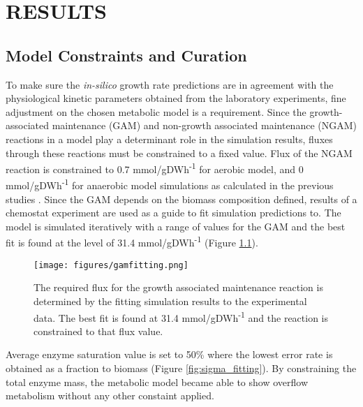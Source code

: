 \chapter{RESULTS}

\section{Model Constraints and Curation}


To make sure the \emph{in-silico} growth rate predictions are in agreement with the physiological kinetic parameters obtained from the laboratory experiments, fine adjustment on the chosen metabolic model is a requirement. Since the growth-associated maintenance (GAM) and non-growth associated maintenance (NGAM) reactions in a model play a determinant role in the simulation results, fluxes through these reactions must be constrained to a fixed value. Flux of the NGAM reaction is constrained to 0.7 mmol/gDWh\textsuperscript{-1} for aerobic model, and 0 mmol/gDWh\textsuperscript{-1} for anaerobic model simulations as calculated in the previous studies \cite{nilsson2016metabolic}. Since the GAM depends on the biomass composition defined, results of a chemostat experiment \cite{van1998effect} are used as a guide to fit simulation predictions to. The model is simulated iteratively with a range of values for the GAM and the best fit is found at the level of 31.4 mmol/gDWh\textsuperscript{-1} (Figure \ref{fig:gam_fitting}).

\begin{figure}[H]
  \begin{center}
      \texttt{[image: figures/gamfitting.png]}
      \caption[The required flux for the growth associated maintenance reaction is determined by the fitting simulation results to the experimental data]{The required flux for the growth associated maintenance reaction is determined by the fitting simulation results to the experimental data. The best fit is found at 31.4 mmol/gDWh\textsuperscript{-1} and the reaction is constrained to that flux value.}
      \label{fig:gam_fitting}
  \end{center}
\end{figure}

Average enzyme saturation value is set to 50\% where the lowest error rate is obtained as a fraction to biomass (Figure \ref{fig:sigma_fitting}). By constraining the total enzyme mass, the metabolic model became able to show overflow metabolism without any other constaint applied.

